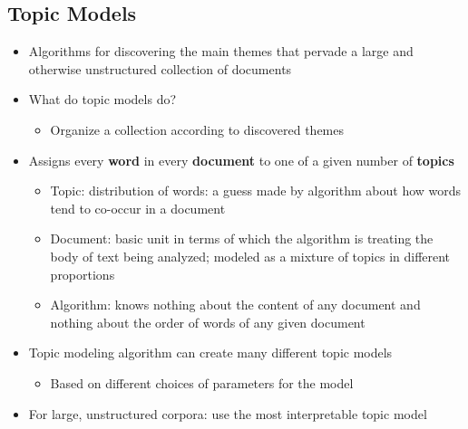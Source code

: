 \documentclass[a4paper]{article}
\begin{document}
\subsection{Topic Models}
\begin{itemize}
    \item Algorithms for discovering the main themes that pervade a large and otherwise unstructured collection of documents
    \item What do topic models do?
    \begin{itemize}[label=$\circ$]
        \item Organize a collection according to discovered themes
    \end{itemize}
    \item Assigns every \textbf{word} in every \textbf{document} to one of a given number of \textbf{topics}
    \begin{itemize}[label=$\circ$]
        \item Topic: distribution of words: a guess made by algorithm about how words tend to co-occur in a document
        \item Document: basic unit in terms of which the algorithm is treating the body of text being analyzed; modeled as a mixture of topics in different proportions
        \item Algorithm: knows nothing about the content of any document and nothing about the order of words of any given document
    \end{itemize}
    \item Topic modeling algorithm can create many different topic models
    \begin{itemize}[label=$\circ$]
        \item Based on different choices of parameters for the model
    \end{itemize}
    \item For large, unstructured corpora: use the most interpretable topic model
\end{itemize}
\end{document}
